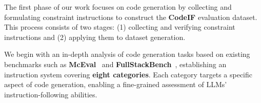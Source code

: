 
The first phase of our work focuses on code generation by collecting and formulating constraint instructions to construct the \textbf{CodeIF} evaluation dataset. This process consists of two stages: (1) collecting and verifying constraint instructions and (2) applying them to dataset generation.

We begin with an in-depth analysis of code generation tasks based on existing benchmarks such as \textbf{McEval}~\cite{mceval} and \textbf{FullStackBench}~\cite{liu2024fullstackbenchevaluatingllms}, establishing an instruction system covering \textbf{eight categories}. Each category targets a specific aspect of code generation, enabling a fine-grained assessment of LLMs’ instruction-following abilities.


